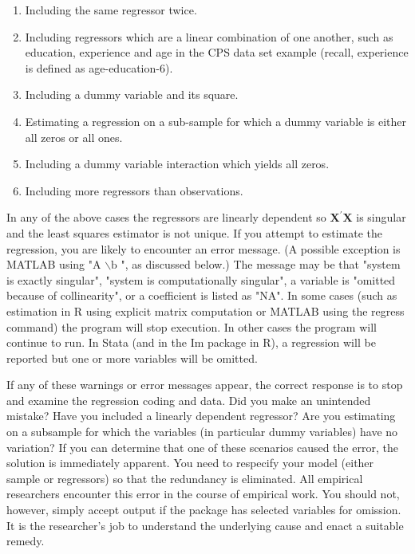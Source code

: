 \documentclass[10pt]{article}
\begin{document}
\begin{enumerate}
  \item Including the same regressor twice.

  \item Including regressors which are a linear combination of one another, such as education, experience and age in the CPS data set example (recall, experience is defined as age-education-6).

  \item Including a dummy variable and its square.

  \item Estimating a regression on a sub-sample for which a dummy variable is either all zeros or all ones.

  \item Including a dummy variable interaction which yields all zeros.

  \item Including more regressors than observations.

\end{enumerate}
In any of the above cases the regressors are linearly dependent so $\boldsymbol{X}^{\prime} \boldsymbol{X}$ is singular and the least squares estimator is not unique. If you attempt to estimate the regression, you are likely to encounter an error message. (A possible exception is MATLAB using "A $\backslash \mathrm{b}$ ", as discussed below.) The message may be that "system is exactly singular", "system is computationally singular", a variable is "omitted because of collinearity", or a coefficient is listed as "NA". In some cases (such as estimation in R using explicit matrix computation or MATLAB using the regress command) the program will stop execution. In other cases the program will continue to run. In Stata (and in the Im package in R), a regression will be reported but one or more variables will be omitted.

If any of these warnings or error messages appear, the correct response is to stop and examine the regression coding and data. Did you make an unintended mistake? Have you included a linearly dependent regressor? Are you estimating on a subsample for which the variables (in particular dummy variables) have no variation? If you can determine that one of these scenarios caused the error, the solution is immediately apparent. You need to respecify your model (either sample or regressors) so that the redundancy is eliminated. All empirical researchers encounter this error in the course of empirical work. You should not, however, simply accept output if the package has selected variables for omission. It is the researcher's job to understand the underlying cause and enact a suitable remedy.
\end{document}
